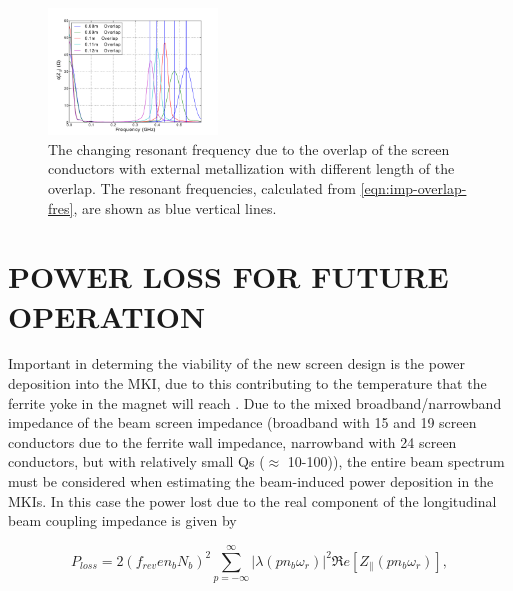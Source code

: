 \documentclass{JAC2003}
\begin{document}
\begin{figure}
\begin{center}
\includegraphics[width=0.4\textwidth]{mki-overlap-len-real-imp-zoom.pdf}
\caption{The changing resonant frequency due to the overlap of the screen conductors with external metallization with different length of the overlap. The resonant frequencies, calculated from \ref{eqn:imp-overlap-fres}, are shown as blue vertical lines.}
\label{fig:mkiOverlapRes}
\end{center}
\end{figure}

\section{POWER LOSS FOR FUTURE OPERATION}

Important in determing the viability of the new screen design is the power deposition into the MKI, due to this contributing to the temperature that the ferrite yoke in the magnet will reach \cite{mki-heatingTemp}. Due to the mixed broadband/narrowband impedance of the beam screen impedance (broadband with 15 and 19 screen conductors due to the ferrite wall impedance, narrowband with 24 screen conductors, but with relatively small Qs ($\approx$ 10-100)), the entire beam spectrum must be considered when estimating the beam-induced power deposition in the MKIs. In this case the power lost due to the real component of the longitudinal beam coupling impedance is given by~\cite{metral_cham2012} 

\begin{equation}
P_{loss} = 2 \left( f_{rev} e n_{b}  N_{b}\right)^{2} \displaystyle\sum\limits_{p = -\infty}^{\infty}  \left| \lambda \left( p n_{b} \omega_{r} \right)  \right|^{2} \Re{}e \left[ Z_{\parallel} \left( p n_{b}\omega_{r} \right) \right],
\label{eqn:heating-gen}
\end{equation} 
\end{document}
